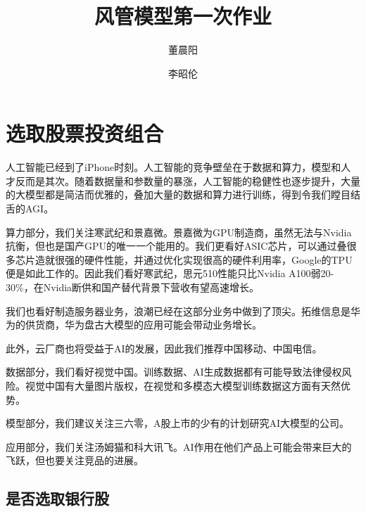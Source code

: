 \documentclass[11pt]{article}
\title{风管模型第一次作业}
\author{董晨阳 \and 李昭伦}
\begin{document}
    \maketitle





\hypertarget{ux9009ux53d6ux80a1ux7968ux6295ux8d44ux7ec4ux5408}{%
\section{选取股票投资组合}\label{ux9009ux53d6ux80a1ux7968ux6295ux8d44ux7ec4ux5408}}

人工智能已经到了iPhone时刻。人工智能的竞争壁垒在于数据和算力，模型和人才反而是其次。随着数据量和参数量的暴涨，人工智能的稳健性也逐步提升，大量的大模型都是简洁而优雅的，叠加大量的数据和算力进行训练，得到令我们瞠目结舌的AGI。

算力部分，我们关注寒武纪和景嘉微。景嘉微为GPU制造商，虽然无法与Nvidia抗衡，但也是国产GPU的唯一一个能用的。我们更看好ASIC芯片，可以通过叠很多芯片造就很强的硬件性能，并通过优化实现很高的硬件利用率，Google的TPU便是如此工作的。因此我们看好寒武纪，思元510性能只比Nvidia
A100弱20-30\%，在Nvidia断供和国产替代背景下营收有望高速增长。

我们也看好制造服务器业务，浪潮已经在这部分业务中做到了顶尖。拓维信息是华为的供货商，华为盘古大模型的应用可能会带动业务增长。

此外，云厂商也将受益于AI的发展，因此我们推荐中国移动、中国电信。

数据部分，我们看好视觉中国。训练数据、AI生成数据都有可能导致法律侵权风险。视觉中国有大量图片版权，在视觉和多模态大模型训练数据这方面有天然优势。

模型部分，我们建议关注三六零，A股上市的少有的计划研究AI大模型的公司。

应用部分，我们关注汤姆猫和科大讯飞。AI作用在他们产品上可能会带来巨大的飞跃，但也要关注竞品的进展。

\hypertarget{ux662fux5426ux9009ux53d6ux94f6ux884cux80a1}{%
\subsection{是否选取银行股}\label{ux662fux5426ux9009ux53d6ux94f6ux884cux80a1}}
\end{document}
